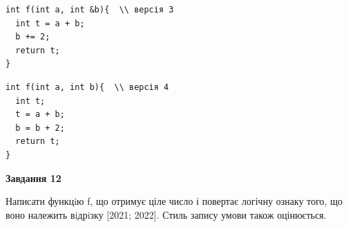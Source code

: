 \documentclass[12pt, ukrainian]{article}
\begin{document}
{\begin {large}
\begin{minipage}[t]{11.0cm}
\vspace{-8mm}\begin{verbatim}
int f(int a, int &b){  \\ версія 3
  int t = a + b;
  b += 2;
  return t;
}
\end{verbatim}

\vspace{-8mm}\begin{verbatim}
int f(int a, int b){  \\ версія 4
  int t;
  t = a + b;
  b = b + 2;
  return t;
}
\end{verbatim}



\begin{center}
\textbf{Завдання 12}
\end{center}

Написати функцiю f, що отримує ціле число і повертає логічну ознаку того, що воно належить вiдрiзку [2021; 2022]. Стиль запису умови також оцінюється.\par

\end{minipage}

\end {large}}
\newpage
\end{document}
